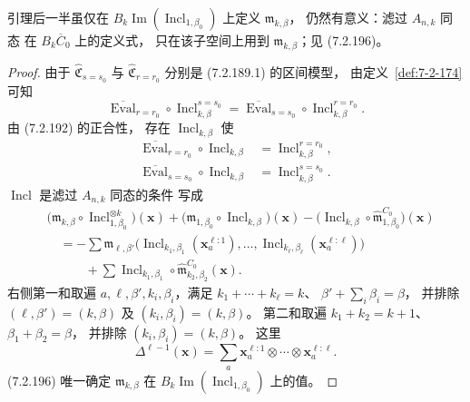 引理后一半虽仅在
$B_k\operatorname{Im}
(\operatorname{Incl}_{1,\beta_0})$
上定义 $\mathfrak m_{k,\beta}$，
仍然有意义：滤过 $A_{n,k}$ 同态
在 $B_k\overline C_0$ 上的定义式，
只在该子空间上用到
$\mathfrak m_{k,\beta}$；见 (7.2.196)。

\begin{proof}
由于
$\widehat{\mathfrak C}_{s=s_0}$
与 $\widehat{\mathfrak C}_{r=r_0}$
分别是 (7.2.189.1) 的区间模型，
由定义~\ref{def:7-2-174} 可知
\begin{equation}
\overline{\operatorname{Eval}}_{r=r_0}
\circ\operatorname{Incl}^{s=s_0}_{k,\beta}
=
\overline{\operatorname{Eval}}_{s=s_0}
\circ\operatorname{Incl}^{r=r_0}_{k,\beta}.
\tag{7.2.194}\label{eq:7-2-194}
\end{equation}
由 (7.2.192) 的正合性，
存在 $\operatorname{Incl}_{k,\beta}$ 使
\begin{equation}
\begin{aligned}
\overline{\operatorname{Eval}}_{r=r_0}
\circ\operatorname{Incl}_{k,\beta}
&=\operatorname{Incl}^{r=r_0}_{k,\beta},\\
\overline{\operatorname{Eval}}_{s=s_0}
\circ\operatorname{Incl}_{k,\beta}
&=\operatorname{Incl}^{s=s_0}_{k,\beta}.
\end{aligned}
\tag{7.2.195}\label{eq:7-2-195}
\end{equation}
$\operatorname{Incl}$ 是滤过 $A_{n,k}$ 同态的条件
写成
\begin{equation}
\begin{aligned}
&\bigl(\mathfrak m_{k,\beta}
\circ\operatorname{Incl}_{1,\beta_0}^{\otimes k}\bigr)
(\mathbf x)
+\bigl(\mathfrak m_{1,\beta_0}
\circ\operatorname{Incl}_{k,\beta}\bigr)(\mathbf x)
-\bigl(\operatorname{Incl}_{k,\beta}
\circ\widehat{\mathfrak m}^{C_0}_{1,\beta_0}\bigr)
(\mathbf x)\\
&\quad=
-\sum
\mathfrak m_{\ell,\beta'}
\bigl(\operatorname{Incl}_{k_1,\beta_1}
(\mathbf x_a^{\ell:1}),\ldots,
\operatorname{Incl}_{k_\ell,\beta_\ell}
(\mathbf x_a^{\ell:\ell})\bigr)\\
&\qquad\quad+
\sum\operatorname{Incl}_{k_1,\beta_1}
\circ\widehat{\mathfrak m}^{C_0}_{k_2,\beta_2}
(\mathbf x).
\end{aligned}
\tag{7.2.196}\label{eq:7-2-196}
\end{equation}
右侧第一和取遍
$a,\ell,\beta',k_i,\beta_i$，满足
$k_1+\cdots+k_\ell=k$、
$\beta'+\sum_i\beta_i=\beta$，
并排除
$(\ell,\beta')=(k,\beta)$
及 $(k_i,\beta_i)=(k,\beta)$。
第二和取遍
$k_1+k_2=k+1$、
$\beta_1+\beta_2=\beta$，
并排除 $(k_i,\beta_i)=(k,\beta)$。
这里
\[
\Delta^{\ell-1}(\mathbf x)
=\sum_a
\mathbf x_a^{\ell:1}\otimes\cdots\otimes
\mathbf x_a^{\ell:\ell}.
\]
(7.2.196) 唯一确定
$\mathfrak m_{k,\beta}$ 在
$B_k\operatorname{Im}
(\operatorname{Incl}_{1,\beta_0})$ 上的值。


\end{proof}
